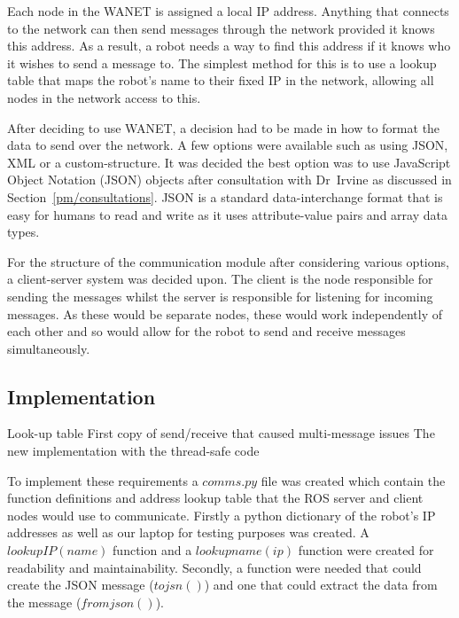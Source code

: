 Each node in the WANET is assigned a local IP address. 
Anything that connects to the network can then send messages through 
the network provided it knows this address. As a result, a robot 
needs a way to find this address if it knows who it wishes to send 
a message to. The simplest method for this is to use a lookup table 
that maps the robot's name to their fixed IP in the network, allowing 
all nodes in the network access to this.

After deciding to use WANET, a decision  had to be made in how to format 
the data to send over the network. A few options were available such as 
using JSON, XML or a custom-structure. It was decided the best option was 
to use JavaScript Object Notation (JSON) objects after consultation with 
Dr~Irvine as discussed in Section~\ref{pm/consultations}. JSON is a 
standard data-interchange format that is easy for humans to read and write 
as it uses attribute-value pairs and array data types.

For the structure of the communication module after considering various options, 
a client-server system was decided upon. The client is the node 
responsible for sending the messages whilst the server is responsible 
for listening for incoming messages. As these would be separate nodes, 
these would work independently of each other and so would allow for the 
robot to send and receive messages simultaneously. 

\subsection{Implementation}\label{soft/comms/impl}
Look-up table
First copy of send/receive that caused multi-message issues
The new implementation with the thread-safe code

To implement these requirements a $comms.py$ file was created which contain 
the function definitions and address lookup table that the ROS server and 
client nodes would use to communicate. Firstly a python dictionary of the 
robot's IP addresses as well as our laptop for testing purposes was created. 
A $lookupIP(name)$ function and a $lookupname(ip)$ function were created for 
readability and maintainability. Secondly, a function were needed that could 
create the JSON message ($tojsn()$) and one that could extract the data from 
the message ($fromjson()$). 

